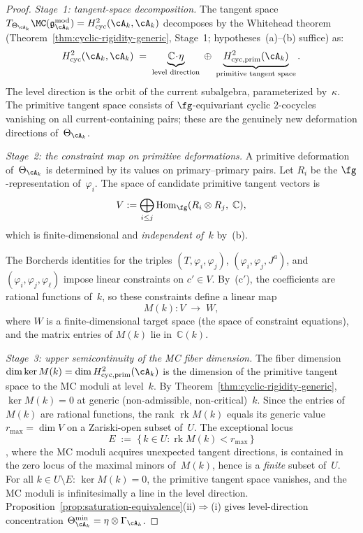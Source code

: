 \begin{proof}
\emph{Stage~1: tangent-space decomposition.}
The tangent space $T_{\Theta_{{\cA}_k}}\MC(\mathfrak{g}_{{\cA}_k}^{\mathrm{mod}})
= H^2_{\mathrm{cyc}}({\cA}_k, {\cA}_k)$
decomposes by the Whitehead theorem
(Theorem~\ref{thm:cyclic-rigidity-generic}, Stage~1;
hypotheses~(a)--(b) suffice) as:
\begin{equation}\label{eq:whitehead-family}
H^2_{\mathrm{cyc}}({\cA}_k, {\cA}_k)
\;=\;
\underbrace{\mathbb{C}\!\cdot\!\eta}_{\text{level direction}}
\;\oplus\;
\underbrace{H^2_{\mathrm{cyc,prim}}({\cA}_k)}_{\text{primitive
  tangent space}}.
\end{equation}
The level direction is the orbit of the current subalgebra,
parameterized by~$\kappa$.  The primitive tangent space consists of
$\fg$-equivariant cyclic $2$-cocycles vanishing on all
current-containing pairs; these are the genuinely new deformation
directions of~$\Theta_{{\cA}_k}$.

\medskip
\emph{Stage~2: the constraint map on primitive deformations.}
A primitive deformation of~$\Theta_{{\cA}_k}$ is determined by its
values on primary--primary pairs.  Let
$R_i$ be the $\fg$-representation of~$\varphi_i$.  The space
of candidate primitive tangent vectors is
\[
V := \bigoplus_{i \leq j} \operatorname{Hom}_{\fg}(R_i \otimes R_j,\;
\mathbb{C}),
\]
which is finite-dimensional and \emph{independent of\/~$k$}
by~(b).

The Borcherds identities for the triples
$(T, \varphi_i, \varphi_j)$,
$(\varphi_i, \varphi_j, J^a)$, and
$(\varphi_i, \varphi_j, \varphi_\ell)$
impose linear constraints on $c' \in V$.
By~(c$'$), the coefficients are rational functions
of\/~$k$, so these constraints define a linear map
\[
M(k)\colon V \;\longrightarrow\; W,
\]
where $W$ is a finite-dimensional target space (the space
of constraint equations), and the matrix entries of $M(k)$
lie in~$\mathbb{C}(k)$.

\medskip
\emph{Stage~3: upper semicontinuity of the MC fiber dimension.}
The fiber dimension $\dim\ker M(k)
= \dim H^2_{\mathrm{cyc,prim}}({\cA}_k)$
is the dimension of the primitive tangent space to the MC moduli
at level~$k$.  By Theorem~\ref{thm:cyclic-rigidity-generic},
$\ker M(k) = 0$ at generic (non-admissible, non-critical)~$k$.
Since the entries of~$M(k)$ are rational functions, the rank
$\operatorname{rk} M(k)$ equals its generic value
$r_{\max} = \dim V$ on a Zariski-open subset of~$U$.
The exceptional locus
\[
E \;:=\; \bigl\{\, k \in U : \operatorname{rk} M(k) < r_{\max} \,\bigr\}
\]
, where the MC moduli acquires unexpected tangent directions, is
contained in the zero locus of the maximal minors
of~$M(k)$, hence is a \emph{finite} subset of~$U$.
For all $k \in U \setminus E$:
$\ker M(k) = 0$, the primitive tangent space vanishes,
and the MC moduli is infinitesimally a line in the level
direction.
Proposition~\ref{prop:saturation-equivalence}(ii)$\Rightarrow$(i)
gives level-direction concentration
$\Theta_{{\cA}_k}^{\min} = \eta \otimes \Gamma_{{\cA}_k}$.
\end{proof}


